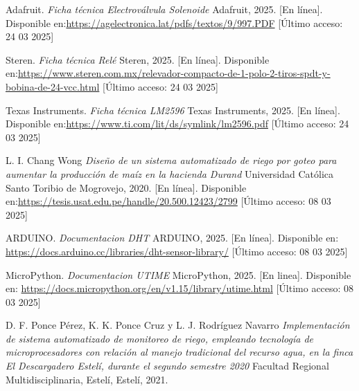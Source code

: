 \documentclass[pdflatex,sn-mathphys-num]{sn-jnl}%
\theoremstyle{thmstyleone}%
\theoremstyle{thmstyletwo}%
\theoremstyle{thmstylethree}%
\begin{document}
\begin{multicols}{2}
\begin{thebibliography}{4}
Adafruit.
\textit{Ficha técnica Electroválvula Solenoide}
Adafruit, 2025.
[En línea]. Disponible en:\url{https://agelectronica.lat/pdfs/textos/9/997.PDF}
[Último acceso: 24 03 2025] 

Steren.
\textit{Ficha técnica Relé}
Steren, 2025.
[En línea]. Disponible en:\href{https://www.steren.com.mx/relevador-compacto-de-1-polo-2-tiros-spdt-y-bobina-de-24-vcc.html}{https://www.steren.com.mx/relevador-compacto-de-1-polo-2-tiros-spdt-y- bobina-de-24-vcc.html}
[Último acceso: 24 03 2025] 

Texas Instruments.
\textit{Ficha técnica LM2596}
Texas Instruments, 2025.
[En línea]. Disponible en:\url{https://www.ti.com/lit/ds/symlink/lm2596.pdf}
[Último acceso: 24 03 2025] 

L. I. Chang Wong
\textit{Diseño de un sistema automatizado de riego por goteo para aumentar la producción de maíz en la hacienda Durand}
Universidad Católica Santo Toribio de Mogrovejo, 2020.
[En línea]. Disponible en:\url{https://tesis.usat.edu.pe/handle/20.500.12423/2799}
[Último acceso: 08 03 2025]

ARDUINO.
\textit{Documentacion DHT}
ARDUINO, 2025.
[En línea]. Disponible en: \url{https://docs.arduino.cc/libraries/dht-sensor-library/}
[Último acceso: 08 03 2025]

MicroPython.
\textit{Documentacion UTIME}
MicroPython, 2025.
[En linea]. Disponible en: \url{https://docs.micropython.org/en/v1.15/library/utime.html}
[Último acceso: 08 03 2025]

D. F. Ponce Pérez, K. K. Ponce Cruz y L. J. Rodríguez Navarro
\textit{Implementación de sistema automatizado de monitoreo de riego, empleando tecnología de microprocesadores con relación al manejo tradicional del recurso agua, en la finca El Descargadero Estelí, durante el segundo semestre 2020}
Facultad Regional Multidisciplinaria, Estelí, Estelí, 2021.

\end{thebibliography}
\end{multicols}
\end{document}
